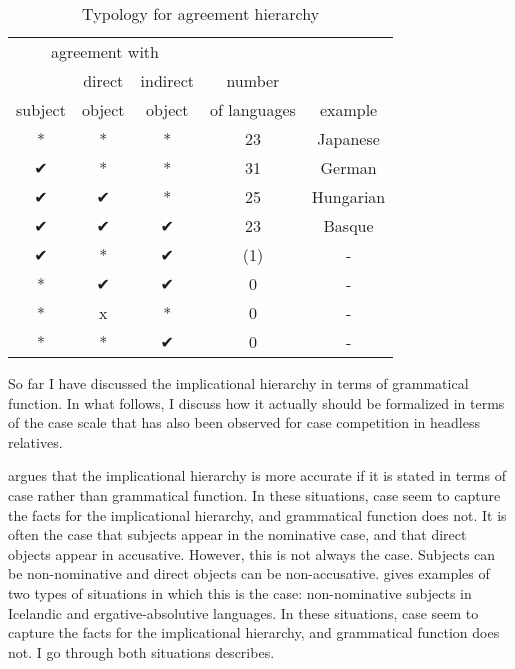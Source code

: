  \begin{table}[H]
   \center
   \caption {Typology for agreement hierarchy}
     \begin{tabular}[t]{ccccc}
       \toprule
           \multicolumn{3}{c}{agreement with} &              &         \\
       \cmidrule{1-3}
                    & direct & indirect       & number       &         \\
           subject  & object & object         & of languages & example \\
       \cmidrule{1-3} \cmidrule{4-4} \cmidrule{5-5}
           *    & * & * & 23  & Japanese    \\
           ✔    & * & * & 31  & German     \\
           ✔    & ✔ & * & 25  & Hungarian  \\
           ✔    & ✔ & ✔ & 23  & Basque     \\
           ✔    & * & ✔ & (1) & -          \\
           {*}  & ✔ & ✔ & 0   & -          \\
           {*}  & x & * & 0   & -          \\
           {*}  & * & ✔ & 0   & -          \\
       \bottomrule
     \end{tabular}
     \label{tbl:agr-typo}
 \end{table}

So far I have discussed the implicational hierarchy in terms of grammatical function. In what follows, I discuss how it actually should be formalized in terms of the case scale that has also been observed for case competition in headless relatives.

\citet{bobaljik2006} argues that the implicational hierarchy is more accurate if it is stated in terms of case rather than grammatical function. In these situations, case seem to capture the facts for the implicational hierarchy, and grammatical function does not. It is often the case that subjects appear in the nominative case, and that direct objects appear in accusative. However, this is not always the case. Subjects can be non-nominative and direct objects can be non-accusative. \citeauthor{bobaljik2006} gives examples of two types of situations in which this is the case: non-nominative subjects in Icelandic and ergative-absolutive languages. In these situations, case seem to capture the facts for the implicational hierarchy, and grammatical function does not. I go through both situations \citeauthor{bobaljik2006} describes.

